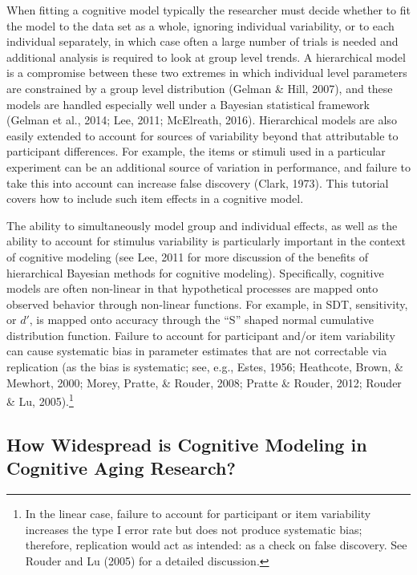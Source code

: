 \documentclass[
  english,
  ,man,floatsintext]{apa6}
\begin{document}
When fitting a cognitive model typically the researcher must decide whether to fit the model to the data set as a whole, ignoring individual variability, or to each individual separately, in which case often a large number of trials is needed and additional analysis is required to look at group level trends. A hierarchical model is a compromise between these two extremes in which individual level parameters are constrained by a group level distribution (Gelman \& Hill, 2007), and these models are handled especially well under a Bayesian statistical framework (Gelman et al., 2014; Lee, 2011; McElreath, 2016). Hierarchical models are also easily extended to account for sources of variability beyond that attributable to participant differences. For example, the items or stimuli used in a particular experiment can be an additional source of variation in performance, and failure to take this into account can increase false discovery (Clark, 1973). This tutorial covers how to include such item effects in a cognitive model.

The ability to simultaneously model group and individual effects, as well as the ability to account for stimulus variability is particularly important in the context of cognitive modeling (see Lee, 2011 for more discussion of the benefits of hierarchical Bayesian methods for cognitive modeling). Specifically, cognitive models are often non-linear in that hypothetical processes are mapped onto observed behavior through non-linear functions. For example, in SDT, sensitivity, or \(d'\), is mapped onto accuracy through the \enquote{S} shaped normal cumulative distribution function. Failure to account for participant and/or item variability can cause systematic bias in parameter estimates that are not correctable via replication (as the bias is systematic; see, e.g., Estes, 1956; Heathcote, Brown, \& Mewhort, 2000; Morey, Pratte, \& Rouder, 2008; Pratte \& Rouder, 2012; Rouder \& Lu, 2005).\footnote{In the linear case, failure to account for participant or item variability increases the type I error rate but does not produce systematic bias; therefore, replication would act as intended: as a check on false discovery. See Rouder and Lu (2005) for a detailed discussion.}

\hypertarget{how-widespread-is-cognitive-modeling-in-cognitive-aging-research}{%
\subsection{How Widespread is Cognitive Modeling in Cognitive Aging Research?}\label{how-widespread-is-cognitive-modeling-in-cognitive-aging-research}}
\end{document}
